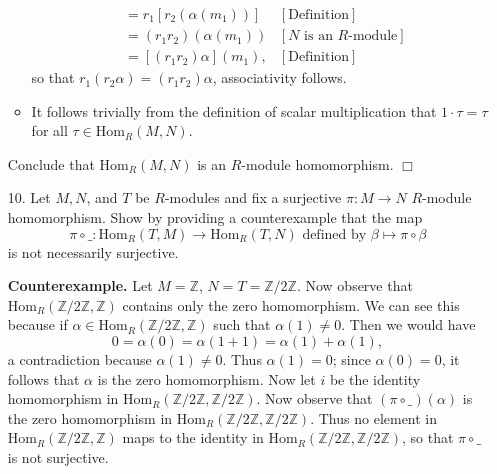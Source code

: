 \documentclass[9pt]{article}
\newcommand{\qed}{\hfill \ensuremath{\Box}}
\newcommand{\Z}{\mathbb{Z}}
\begin{document}
\begin{enumerate}
\begin{itemize}
\begin{align*}
                     &= r_1[r_2(\alpha(m_1))] &[\text{Definition}] \\
                     &= (r_1r_2)(\alpha(m_1))
                        &[N \text{ is an } R\text{-module}] \\
                     &= [(r_1r_2)\alpha](m_1), &[\text{Definition}]
               \end{align*}
               so that $r_1(r_2\alpha) = (r_1r_2)\alpha$, associativity follows.
         \item It follows trivially from the definition of scalar multiplication
               that $1 \cdot\tau = \tau$ for all $\tau \in \text{Hom}_R(M, N)$.
      \end{itemize}
      Conclude that $\text{Hom}_R(M, N)$ is an $R$-module homomorphism. \qed
   \item[10.]   Let $M, N$, and $T$ be $R$-modules and fix a surjective
    		    $\pi : M \rightarrow N$ $R$-module homomorphism. Show by providing
                a counterexample that the map
                $$\pi \circ \_ : \text{Hom}_R(T, M) \rightarrow
                    \text{Hom}_R(T, N) \text{ defined by } \beta
                    \mapsto \pi \circ \beta $$
                is not necessarily surjective.
                
      \textbf{Counterexample.} Let $M = \Z$, $N = T = \Z/2\Z$. Now observe that
      $\text{Hom}_R(\Z/2\Z, \Z)$ contains only the zero homomorphism. We can
      see this because if $\alpha \in \text{Hom}_R(\Z/2\Z, \Z)$ such that
      $\alpha(1) \neq 0$. Then we would have
      $$0 = \alpha(0) = \alpha(1 + 1) = \alpha(1) + \alpha(1),$$
      a contradiction because $\alpha(1) \neq 0$. Thus $\alpha(1) = 0$; since
      $\alpha(0) = 0$, it follows that $\alpha$ is the zero homomorphism. Now
      let $i$ be the identity homomorphism in $\text{Hom}_R(\Z/2\Z,\Z/2\Z)$.
      Now observe that $(\pi \circ \_)(\alpha)$ is the zero homomorphism in
      $\text{Hom}_R(\Z/2\Z, \Z/2\Z)$. Thus no element in
      $\text{Hom}_R(\Z/2\Z, \Z)$ maps to the identity in
      $\text{Hom}_R(\Z/2\Z, \Z/2\Z)$, so that $\pi \circ \_$ is not surjective.
                
\end{enumerate}
\end{document}
